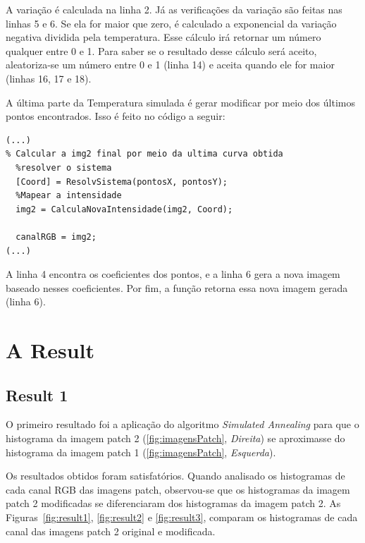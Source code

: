 A variação é calculada na linha 2. Já as verificações da variação são feitas nas linhas 5 e 6. Se ela for maior que zero, é calculado a exponencial da variação negativa dividida pela temperatura. Esse cálculo irá retornar um número qualquer entre 0 e 1. Para saber se o resultado desse cálculo será aceito, aleatoriza-se um número entre 0 e 1 (linha 14) e aceita quando ele for maior (linhas 16, 17 e 18). 

A última parte da Temperatura simulada é gerar modificar por meio dos últimos pontos encontrados. Isso é feito no código a seguir:

\begin{lstlisting}[style=Matlab-editor]
(...)
% Calcular a img2 final por meio da ultima curva obtida 
  %resolver o sistema 
  [Coord] = ResolvSistema(pontosX, pontosY);
  %Mapear a intensidade
  img2 = CalculaNovaIntensidade(img2, Coord);
  
  canalRGB = img2;  
(...)
\end{lstlisting}

A linha 4 encontra os coeficientes dos pontos, e a linha 6 gera a nova imagem baseado nesses coeficientes. Por fim, a função retorna essa nova imagem gerada (linha 6).

\section*{A Result}
\subsection{Result 1}
O primeiro resultado foi a aplicação do algoritmo \textit{Simulated Annealing} para que o histograma da imagem patch 2 (\ref{fig:imagensPatch}, \textit{Direita}) se aproximasse do histograma da imagem patch 1 (\ref{fig:imagensPatch}, \textit{Esquerda}).

Os resultados obtidos foram satisfatórios. Quando analisado os histogramas de cada canal RGB das imagens patch, observou-se que os histogramas da imagem patch 2 modificadas se diferenciaram dos histogramas da imagem patch 2. As Figuras~\ref{fig:result1}, \ref{fig:result2} e \ref{fig:result3}, comparam os histogramas de cada canal das imagens patch 2 original e modificada.

